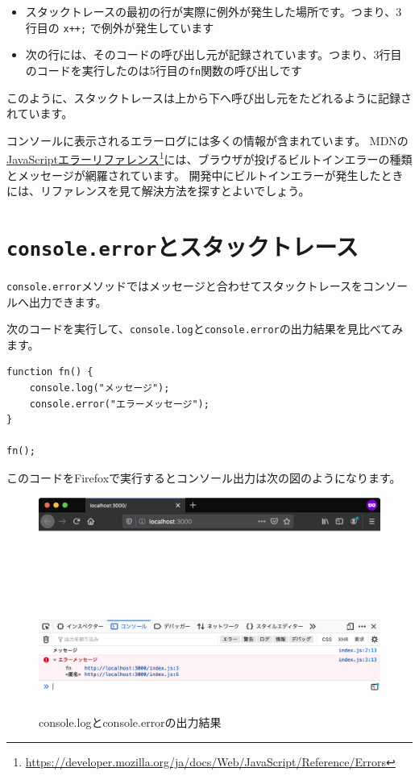 \begin{itemize}
\item
  スタックトレースの最初の行が実際に例外が発生した場所です。つまり、3行目の
  \texttt{x++;} で例外が発生しています
\item
  次の行には、そのコードの呼び出し元が記録されています。つまり、3行目のコードを実行したのは5行目の\texttt{fn}関数の呼び出しです
\end{itemize}
\newpage
このように、スタックトレースは上から下へ呼び出し元をたどれるように記録されています。

コンソールに表示されるエラーログには多くの情報が含まれています。
MDNの\href{https://developer.mozilla.org/ja/docs/Web/JavaScript/Reference/Errors}{JavaScriptエラーリファレンス}\footnote{\url{https://developer.mozilla.org/ja/docs/Web/JavaScript/Reference/Errors}}には、ブラウザが投げるビルトインエラーの種類とメッセージが網羅されています。
開発中にビルトインエラーが発生したときには、リファレンスを見て解決方法を探すとよいでしょう。

\hypertarget{console.error}{%
\section{\texorpdfstring{\texttt{console.error}とスタックトレース}{console.errorとスタックトレース}}\label{console.error}}

\texttt{console.error}メソッドではメッセージと合わせてスタックトレースをコンソールへ出力できます。

次のコードを実行して、\texttt{console.log}と\texttt{console.error}の出力結果を見比べてみます。

\begin{lstlisting}
function fn() {
    console.log("メッセージ");
    console.error("エラーメッセージ");
}

fn();
\end{lstlisting}

このコードをFirefoxで実行するとコンソール出力は次の図のようになります。

\begin{figure}[h]
\centering
\includegraphics[width=120mm]{./fig/console-error.png}
\caption{console.logとconsole.errorの出力結果}
\end{figure}

